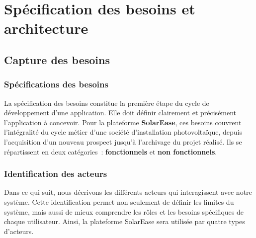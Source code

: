 \chapter{Spécification des besoins et architecture}

\section{Capture des besoins}

\subsection{Spécifications des besoins}

La spécification des besoins constitue la première étape du cycle de
développement d'une application. Elle doit définir clairement et
précisément l'application à concevoir. Pour la plateforme
\textbf{SolarEase}, ces besoins couvrent l'intégralité du cycle métier
d'une société d'installation photovoltaïque, depuis l'acquisition d'un
nouveau prospect jusqu'à l'archivage du projet réalisé. Ils se
répartissent en deux catégories~: \textbf{fonctionnels} et
\textbf{non fonctionnels}.

\subsection{Identification des acteurs}

Dans ce qui suit, nous décrivons les différents acteurs qui interagissent
avec notre système. Cette identification permet non seulement de définir
les limites du système, mais aussi de mieux comprendre les rôles et les
besoins spécifiques de chaque utilisateur. Ainsi, la plateforme SolarEase
sera utilisée par quatre types d'acteurs.

